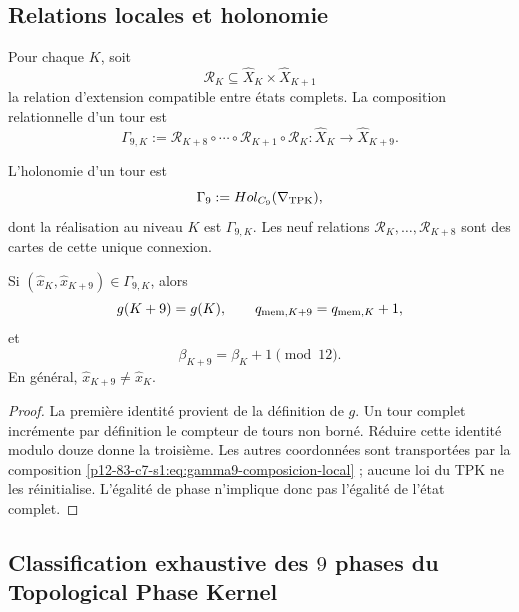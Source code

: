 \subsection{Relations locales et holonomie}

Pour chaque \(K\), soit
\[
 \mathcal R_K\subseteq
 \widehat X_K\times\widehat X_{K+1}
\]
la relation d'extension compatible entre états complets. La composition
relationnelle d'un tour est
\begin{equation}
 \Gamma_{9,K}
 :=\mathcal R_{K+8}\circ\cdots\circ\mathcal R_{K+1}\circ\mathcal R_K
 :\widehat X_K\longrightarrow\widehat X_{K+9}.
\label{p12-83-c7-s1:eq:gamma9-composicion-local}
\end{equation}

\begin{definition}
\label{p12-83-c7-s1:def:holonomia-nonadica}
L'holonomie d'un tour est
\[
 \Gamma_9:=\operatorname{Hol}_{C_9}(\nabla_{\rm TPK}),
\]
dont la réalisation au niveau \(K\) est
\(\Gamma_{9,K}\). Les neuf relations \(\mathcal R_K,\ldots,
\mathcal R_{K+8}\) sont des cartes de cette unique connexion.
\end{definition}

\begin{theorem}
\label{p12-83-c7-s1:thm:retorno-nonadico-sin-reinicio}
Si \((\widehat x_K,\widehat x_{K+9})\in\Gamma_{9,K}\), alors
\[
 g(K+9)=g(K),
 \qquad
 q_{{\rm mem},K+9}=q_{{\rm mem},K}+1,
\]
et
\[
 \beta_{K+9}=\beta_K+1\pmod{12}.
\]
En général, \(\widehat x_{K+9}\neq\widehat x_K\).
\end{theorem}

\begin{proof}
La première identité provient de la définition de \(g\). Un tour complet
incrémente par définition le compteur de tours non borné. Réduire cette
identité modulo douze donne la troisième. Les autres coordonnées sont
transportées par la composition \cref{p12-83-c7-s1:eq:gamma9-composicion-local} ; aucune
loi du TPK ne les réinitialise. L'égalité de phase n'implique donc pas
l'égalité de l'état complet.
\end{proof}

\subsection{Classification exhaustive des \(9\) phases du Topological Phase Kernel}

